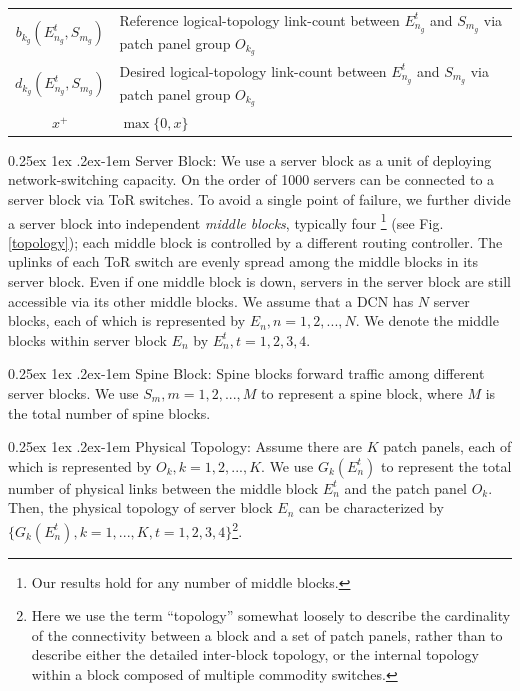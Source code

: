 \documentclass[letterpaper,twocolumn,10pt]{article}
\makeatletter
\renewcommand{\paragraph}{%
  \@startsection{paragraph}{4}%
  {\z@}{0.25ex \@plus 1ex \@minus .2ex}{-1em}%
  {\normalfont\normalsize\bfseries}%
}
\makeatother
\begin{document}
\begin{table}[ht]
\begin{tabular}{|c|p{2.4in}|}
\hline
$b_{k_g}(E_{n_g}^t, S_{m_g})$ & Reference logical-topology link-count between $E_{n_g}^t$ and $S_{m_g}$ via patch panel group $O_{k_g}$ \\
$d_{k_g}(E_{n_g}^t, S_{m_g})$ & Desired logical-topology link-count between $E_{n_g}^t$ and $S_{m_g}$ via patch panel group $O_{k_g}$ \\
\hline
$x^+$ & $\max\{0,x\}$ \\
\hline
\end{tabular}
\label{notations}
\end{table}

\paragraph{Server Block:} We use a server block as a unit of deploying network-switching capacity.  On the order of 1000 servers can be connected to a server block via ToR switches. To avoid a single point of failure, we further divide a server block into  independent \emph{middle blocks}, typically four \footnote{Our results hold for any number of middle blocks.}  (see Fig. \ref{topology}); each middle block is controlled by a different routing controller. The uplinks of each ToR switch are evenly spread among the middle blocks in its server block. Even if one middle block is down, servers in the server block are still accessible via its other middle blocks. We assume that a DCN has  $N$ server blocks, each of which is represented by $E_n, n=1,2,...,N$. We denote the middle blocks within server block $E_n$ by $E_n^t, t=1,2,3,4$.

\paragraph{Spine Block:} Spine blocks forward traffic among different server blocks. We use $S_m, m=1,2,...,M$ to represent a spine block, where $M$ is the total number of spine blocks.

\paragraph{Physical Topology:}  Assume there are $K$ patch panels, each of which is represented by $O_k, k=1,2,...,K$. We use $G_k(E_n^t)$ to represent the total number of physical links between the middle block $E_n^t$ and the patch panel $O_k$. Then, the physical topology of server block $E_n$ can be characterized by $\{G_k(E_n^t), k=1,...,K, t=1,2,3,4\}$\footnote{Here we use the term ``topology'' somewhat loosely to describe the cardinality of the connectivity between a block and a set of patch panels, rather than to describe either the detailed inter-block topology, or the internal topology within a block composed of multiple commodity switches.}. 
\end{document}
